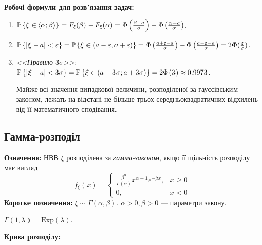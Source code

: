 \noindent \textbf{Робочі формули для розв'язання задач:}
\begin{enumerate}
    \item $\P\left\{\xi \in \left<\alpha; \beta\right>\right\} 
    = F_\xi(\beta) - F_\xi(\alpha) = \Phi\left(\frac{\beta - a}{\sigma}\right)
    - \Phi\left(\frac{\alpha - a}{\sigma}\right)$.
    \item $\P\left\{\left| \xi - a \right| < \varepsilon\right\} = 
    \P\left\{\xi \in \left(a - \varepsilon, a + \varepsilon\right)\right\} = 
    \Phi\left(\frac{a + \varepsilon - a}{\sigma}\right)
    - \Phi\left(\frac{a - \varepsilon - a}{\sigma}\right) = 
    2\Phi(\frac{\varepsilon}{\sigma})$.
    \item \emph{<<Правило $3\sigma$>>}: 
    $\P\left\{\left| \xi - a \right| < 3\sigma\right\} = 
    \P\left\{\xi \in \left( a-3\sigma; a+3\sigma\right)\right\} = 2\Phi\left(3\right)
    \approx 0.9973$.

    Майже всі значення випадкової величини, розподіленої за 
    гауссівським законом, лежать на відстані не більше трьох середньоквадратичних 
    відхилень від її математичного сподівання.
\end{enumerate}

\subsection{Гамма-розподіл}
\noindent\textbf{Означення:}
    НВВ $\xi$ розподілена за \emph{гамма-законом}, 
    якщо її щільність розподілу має вигляд 
    \begin{equation}
        f_\xi(x) = \begin{cases}
            \frac{\beta^\alpha}{\Gamma(\alpha)} x^{\alpha-1} e^{-\beta x}, & x \geq 0 \\
            0, & x < 0
        \end{cases}
    \end{equation}
\textbf{Коротке позначення:} $\xi \sim {\Gamma}(\alpha, \beta)$.
    $\alpha >0, \beta > 0$ --- параметри закону.
\begin{remark}
    ${\Gamma}(1, \lambda) = \mathrm{Exp}(\lambda)$.
\end{remark}
\noindent \textbf{Крива розподілу:}

\begin{center}
\end{center}

